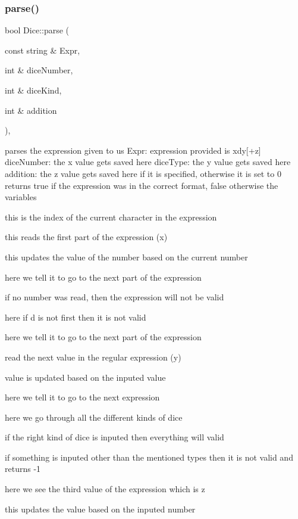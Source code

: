 \subsubsection{\texorpdfstring{parse()}{parse()}}
{\footnotesize\ttfamily bool Dice\+::parse (\begin{DoxyParamCaption}\item[{const string \&}]{Expr,  }\item[{int \&}]{dice\+Number,  }\item[{int \&}]{dice\+Kind,  }\item[{int \&}]{addition }\end{DoxyParamCaption})\hspace{0.3cm}{\ttfamily [static]}, {\ttfamily [private]}}

parses the expression given to us Expr\+: expression provided is xdy\mbox{[}+z\mbox{]} dice\+Number\+: the x value gets saved here dice\+Type\+: the y value gets saved here addition\+: the z value gets saved here if it is specified, otherwise it is set to 0 returns true if the expression was in the correct format, false otherwise the variables

this is the index of the current character in the expression

this reads the first part of the expression (x)

this updates the value of the number based on the current number

here we tell it to go to the next part of the expression

if no number was read, then the expression will not be valid

here if d is not first then it is not valid

here we tell it to go to the next part of the expression

read the next value in the regular expression (y)

value is updated based on the inputed value

here we tell it to go to the next expression

here we go through all the different kinds of dice

if the right kind of dice is inputed then everything will valid

if something is inputed other than the mentioned types then it is not valid and returns -\/1

here we see the third value of the expression which is z

this updates the value based on the inputed number

